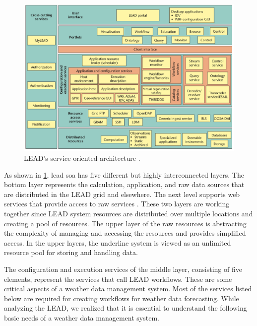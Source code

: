 \begin{figure}[htp]
    \centering
    \includegraphics[width=1\textwidth]{lit/lead/LEADs-service-oriented-architecture-A-wide-variety-of-services-and-resources-grouped_W640.png}
    \caption[LEAD's service-oriented architecture]{LEAD's service-oriented architecture \cite{Droegemeier2005Service-orientedWeather}.}
    \label{fi:lead_soa}
\end{figure}

As shown in \cref{fi:lead_soa}, \acrshort{lead} \acrshort{soa} has five different but highly interconnected layers. The bottom layer represents the calculation, application, and raw data sources that are distributed in the LEAD grid and elsewhere. The next level supports web services that provide access to raw services \cite{Droegemeier2005Service-orientedWeather}. These two layers are working together since LEAD system resources are distributed over multiple locations and creating a pool of resources. The upper layer of the raw resources is abstracting the complexity of managing and accessing the resources and provides simplified access. In the upper layers, the underline system is viewed as an unlimited resource pool for storing and handling data.

The configuration and execution services of the middle layer, consisting of five elements, represent the services that call LEAD workflows. These are some critical aspects of a weather data management system. Most of the services listed below are required for creating workflows for weather data forecasting. While analyzing the LEAD, we realized that it is essential to understand the following basic needs of a weather data management system.

